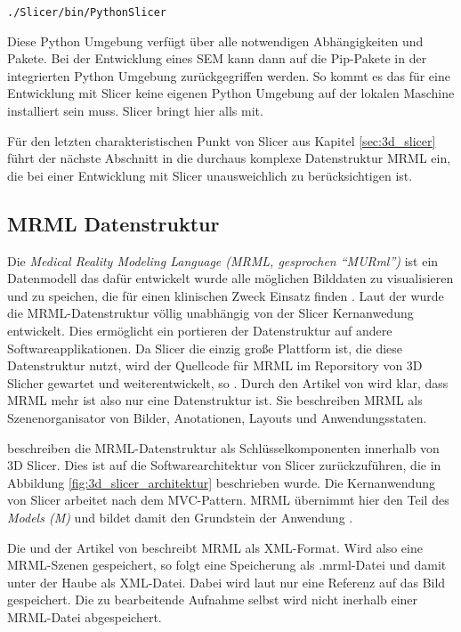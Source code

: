 \texttt{./Slicer/bin/PythonSlicer}

Diese Python Umgebung verfügt über alle notwendigen Abhängigkeiten und Pakete.
Bei der Entwicklung eines SEM kann dann auf die Pip-Pakete in der integrierten
Python Umgebung zurückgegriffen werden. So kommt es das für eine Entwicklung mit
Slicer keine eigenen Python Umgebung auf der lokalen Maschine installiert sein muss.
Slicer bringt hier alls mit.

Für den letzten charakteristischen Punkt von Slicer aus Kapitel
\ref{sec:3d_slicer} führt der nächste Abschnitt in die durchaus komplexe
Datenstruktur MRML ein, die bei einer Entwicklung mit Slicer unausweichlich zu berücksichtigen
ist.

\subsection{MRML Datenstruktur}
\label{subsec:mrml_datenstruktur} Die \textit{Medical Reality Modeling Language
(MRML, gesprochen “MURml”)} ist ein Datenmodell das dafür entwickelt wurde alle
möglichen Bilddaten zu visualisieren und zu speichen, die für einen klinischen Zweck
Einsatz finden \citep[vgl.][]{slicer2024}. Laut der \citet{slicer2024} wurde die
MRML-Datenstruktur völlig unabhängig von der Slicer Kernanwedung entwickelt. Dies
ermöglicht ein portieren der Datenstruktur auf andere Softwareapplikationen. Da
Slicer die einzig große Plattform ist, die diese Datenstruktur nutzt, wird der
Quellcode für MRML im Reporsitory von 3D Slicher gewartet und weiterentwickelt, so
\citet{slicer2024}. Durch den Artikel von \citet[Seite 1327]{fedorov2012slicer} wird
klar, dass MRML mehr ist also nur eine Datenstruktur ist. Sie beschreiben MRML als
Szenenorganisator von Bilder, Anotationen, Layouts und Anwendungsstaten.

\citet[Seite 1331]{fedorov2012slicer} beschreiben die MRML-Datenstruktur als Schlüsselkomponenten
innerhalb von 3D Slicer. Dies ist auf die Softwarearchitektur von Slicer
zurückzuführen, die in Abbildung \ref{fig:3d_slicer_architektur} beschrieben wurde.
Die Kernanwendung von Slicer arbeitet nach dem MVC-Pattern. MRML übernimmt hier den
Teil des \textit{Models (M)} und bildet damit den Grundstein der Anwendung
\citep[vgl.][Seite 1332]{fedorov2012slicer}.

Die \citet{slicer2024} und der Artikel von \citet[Seite 1327]{fedorov2012slicer}
beschreibt MRML als XML-Format. Wird also eine MRML-Szenen gespeichert, so folgt
eine Speicherung als .mrml-Datei und damit unter der Haube als XML-Datei. Dabei wird
laut \citet{slicer2024} nur eine Referenz auf das Bild gespeichert. Die zu bearbeitende
Aufnahme selbst wird nicht inerhalb einer MRML-Datei abgespeichert.

